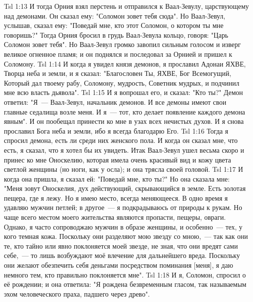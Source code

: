 \vs Tsl 1:13 
И тогда Орния взял перстень и отправился к Ваал-Зевулу, царствующему над демонами. Он сказал ему: "Соломон зовет тебя сюда". Но Ваал-Зевул, услышав, сказал ему: "Поведай мне, кто этот Соломон, о котором ты мне говоришь?" Тогда Орния бросил в грудь Ваал-Зевула кольцо, говоря: "Царь Соломон зовет тебя". Но Ваал-Зевул громко завопил сильным голосом и изверг великое огненное пламя; и он поднялся и последовал за Орнией и пришел к Соломону.
\vs Tsl 1:14 
И когда я увидел князя демонов, я прославил Адонаи ЯХВЕ, Творца неба и земли, и я сказал: "Благословен Ты, ЯХВЕ, Бог Всемогущий, Который дал твоему рабу, Соломону, мудрость, Советник мудрых, и подчинил мне всю власть дьявола".
\vs Tsl 1:15 
И я вопрошал его, и сказал: "Кто ты?" Демон ответил: "Я~--- Ваал-Зевул, начальник демонов. И все демоны имеют свои главные седалища возле меня. И я~--- тот, кто делает появление каждого демона явным". И он пообещал принести ко мне в узах всех нечистых духов. И я снова прославил Бога неба и земли, ибо я всегда благодарю Его.
\vs Tsl 1:16 
Тогда я спросил демона, есть ли среди них женского пола. И когда он сказал мне, что есть, я сказал, что я хотел бы их увидеть. Итак Ваал-Зевул ушел весьма скоро и принес ко мне Оноскелию, которая имела очень красивый вид и кожу цвета светлой женщины (но ноги, как у осла); и она трясла своей головой.
\vs Tsl 1:17 
И когда она пришла, я сказал ей: "Поведай мне, кто ты?" Но она сказала мне: "Меня зовут Оноскелия, дух действующий, скрывающийся в земле. Есть золотая пещера, где я лежу. Но я имею место, всегда меняющееся. В одно время я удавляю мужчин петлей; в другое~--- я подкрадываюсь от природы к рукам. Но чаще всего местом моего жительства являются пропасти, пещеры, овраги. Однако, я часто сопроводжаю мужчин в образе женщины, и особенно~--- тех, у кого темная кожа. Поскольку они разделяют мою звезду со мною,~--- так как они те, кто тайно или явно поклоняется моей звезде, не зная, что они вредят сами себе,~--- то лишь возбуждают моё влечение для дальнейшего вреда. Поскольку они желают обезпечить себя деньгами посредством поминания [меня], я даю немного тем, кто правильно поклоняется мне".
\vs Tsl 1:18 
И я, Соломон, спросил о её рождении; и она ответила: "Я рождена безвременным гласом, так называемым эхом человеческого праха, падшего через древо".
